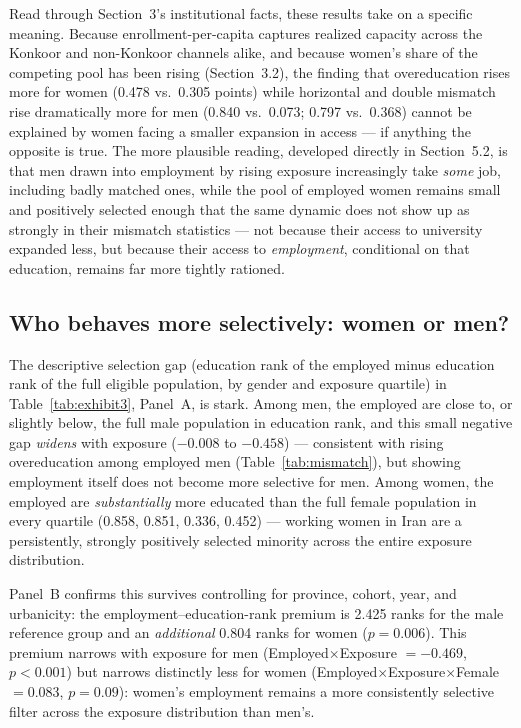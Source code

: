 \documentclass[11pt]{article}
\begin{document}
Read through Section~3's institutional facts, these results take on a specific meaning. Because enrollment-per-capita captures realized capacity across the Konkoor and non-Konkoor channels alike, and because women's share of the competing pool has been rising (Section~3.2), the finding that overeducation rises more for women (0.478 vs.\ 0.305 points) while horizontal and double mismatch rise dramatically more for men (0.840 vs.\ 0.073; 0.797 vs.\ 0.368) cannot be explained by women facing a smaller expansion in access --- if anything the opposite is true. The more plausible reading, developed directly in Section~5.2, is that men drawn into employment by rising exposure increasingly take \emph{some} job, including badly matched ones, while the pool of employed women remains small and positively selected enough that the same dynamic does not show up as strongly in their mismatch statistics --- not because their access to university expanded less, but because their access to \emph{employment}, conditional on that education, remains far more tightly rationed.

\subsection{Who behaves more selectively: women or men?}

The descriptive selection gap (education rank of the employed minus education rank of the full eligible population, by gender and exposure quartile) in Table~\ref{tab:exhibit3}, Panel~A, is stark. Among men, the employed are close to, or slightly below, the full male population in education rank, and this small negative gap \emph{widens} with exposure ($-0.008$ to $-0.458$) --- consistent with rising overeducation among employed men (Table~\ref{tab:mismatch}), but showing employment itself does not become more selective for men. Among women, the employed are \emph{substantially} more educated than the full female population in every quartile (0.858, 0.851, 0.336, 0.452) --- working women in Iran are a persistently, strongly positively selected minority across the entire exposure distribution.

Panel~B confirms this survives controlling for province, cohort, year, and urbanicity: the employment--education-rank premium is 2.425 ranks for the male reference group and an \emph{additional} 0.804 ranks for women ($p=0.006$). This premium narrows with exposure for men (Employed$\times$Exposure $=-0.469$, $p<0.001$) but narrows distinctly less for women (Employed$\times$Exposure$\times$Female $=0.083$, $p=0.09$): women's employment remains a more consistently selective filter across the exposure distribution than men's.
\end{document}
